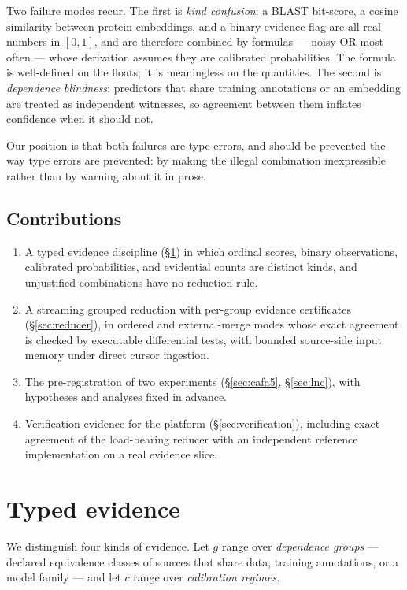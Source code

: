 \documentclass[11pt]{article}
\begin{document}
Two failure modes recur. The first is \emph{kind confusion}: a BLAST bit-score,
a cosine similarity between protein embeddings, and a binary evidence flag are
all real numbers in $[0,1]$, and are therefore combined by formulas --- noisy-OR
most often --- whose derivation assumes they are calibrated probabilities. The
formula is well-defined on the floats; it is meaningless on the quantities. The
second is \emph{dependence blindness}: predictors that share training
annotations or an embedding are treated as independent witnesses, so agreement
between them inflates confidence when it should not.

Our position is that both failures are type errors, and should be prevented the
way type errors are prevented: by making the illegal combination inexpressible
rather than by warning about it in prose.

\subsection*{Contributions}

\begin{enumerate}
  \item A typed evidence discipline (\S\ref{sec:evidence}) in which ordinal
    scores, binary observations, calibrated probabilities, and evidential
    counts are distinct kinds, and unjustified combinations have no reduction
    rule.
  \item A streaming grouped reduction with per-group evidence certificates
    (\S\ref{sec:reducer}), in ordered and external-merge modes whose exact
    agreement is checked by executable differential tests, with bounded
    source-side input memory under direct cursor ingestion.
  \item The pre-registration of two experiments (\S\ref{sec:cafa5},
    \S\ref{sec:lnc}), with hypotheses and analyses fixed in advance.
  \item Verification evidence for the platform (\S\ref{sec:verification}),
    including exact agreement of the load-bearing reducer with an independent
    reference implementation on a real evidence slice.
\end{enumerate}

\section{Typed evidence}\label{sec:evidence}

We distinguish four kinds of evidence. Let $g$ range over \emph{dependence
groups} --- declared equivalence classes of sources that share data, training
annotations, or a model family --- and let $c$ range over \emph{calibration
regimes}.
\end{document}
